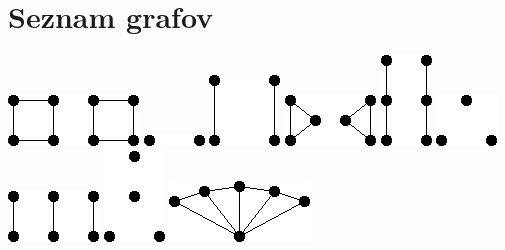 \documentclass[11pt,paper=b5,footinclude,headinclude]{scrbook} %
\begin{document}
\chapter{Seznam grafov}
{
  	\centering
  	\includegraphics[scale=0.5,frame]{smallGraphs/g_2C4.png}     
\includegraphics[scale=0.5,frame]{smallGraphs/g_2K1.png}     
\includegraphics[scale=0.5,frame]{smallGraphs/g_2K2.png}     
\includegraphics[scale=0.5,frame]{smallGraphs/g_2K3.png}     
\includegraphics[scale=0.5,frame]{smallGraphs/g_2P3.png}     
\includegraphics[scale=0.5,frame]{smallGraphs/g_3K1.png}     
\includegraphics[scale=0.5,frame]{smallGraphs/g_3K2.png}     
\includegraphics[scale=0.5,frame]{smallGraphs/g_4K1.png}     
\includegraphics[scale=0.5,frame]{smallGraphs/g_4fan.png}     
}
\end{document}
